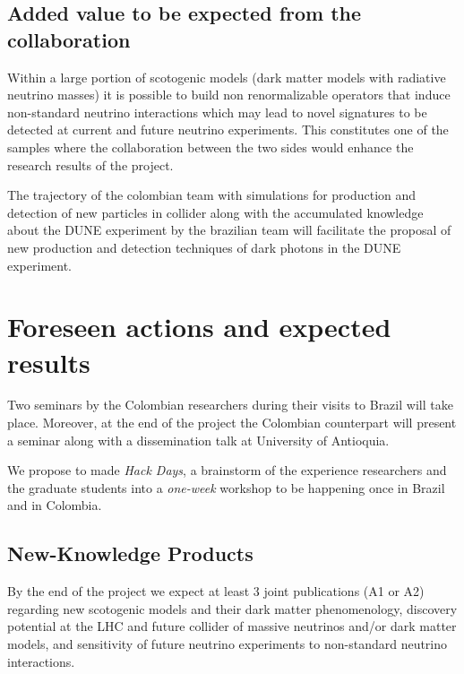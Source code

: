 \documentclass[a4paper,10pt,epsfig,epsf,amsfonts,amsmath]{article}
\begin{document}
  
  \subsection{Added value to be expected from the collaboration}
  Within a large portion of scotogenic models (dark matter models with 
  radiative neutrino masses) it is possible to build non renormalizable
  operators that induce non-standard neutrino interactions which may lead
  to novel signatures to be detected at current and future neutrino experiments. 
  This constitutes one of the samples where the collaboration between the two sides
  would enhance the research results of the project. 
  
  
  The trajectory of the colombian team with simulations for production
  and detection of new particles in collider along with the
  accumulated knowledge about the DUNE experiment by the brazilian
  team will facilitate the proposal of new production and detection
  techniques of dark photons in the DUNE experiment.
  
\section{Foreseen actions and expected results}
Two seminars by the Colombian researchers during their visits to Brazil will take place. Moreover,  at the end of the project the Colombian counterpart will present a seminar along with a dissemination talk at University of Antioquia.  

We propose to made {\it Hack Days}, a brainstorm of the experience researchers and the graduate students into a {\it one-week} workshop to be happening once in Brazil and in Colombia.

\subsection{New-Knowledge Products}


By the end of the project we expect at least 3 joint publications (A1 or A2) regarding new scotogenic models and their dark matter phenomenology,  discovery potential at the LHC and future collider of massive neutrinos and/or dark matter models, and sensitivity of future neutrino experiments to non-standard neutrino interactions.
\end{document}
